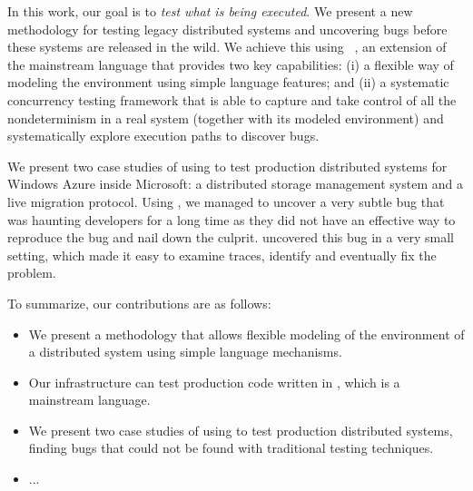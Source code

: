 In this work, our goal is to \emph{test what is being executed}. We present a new methodology for testing legacy distributed systems and uncovering bugs before these systems are released in the wild. We achieve this using \psharp~\cite{deligiannis2015psharp}, an extension of the mainstream language \csharp that provides two key capabilities: (i) a flexible way of modeling the environment using simple language features; and (ii) a systematic concurrency testing framework that is able to capture and take control of all the nondeterminism in a real system (together with its modeled environment) and systematically explore execution paths to discover bugs.

We present two case studies of using \psharp to test production distributed systems for Windows Azure inside Microsoft: a distributed storage management system and a live migration protocol. Using \psharp, we managed to uncover a very subtle bug that was haunting developers for a long time as they did not have an effective way to reproduce the bug and nail down the culprit. \psharp uncovered this bug in a very small setting, which made it easy to examine traces, identify and eventually fix the problem.

To summarize, our contributions are as follows:

\begin{itemize}
\item We present a methodology that allows flexible modeling of the environment of a distributed system using simple language mechanisms.
\item Our infrastructure can test production code written in \csharp, which is a mainstream language.
\item We present two case studies of using \psharp to test production distributed systems, finding bugs that could not be found with traditional testing techniques.
\item ...
\end{itemize}
